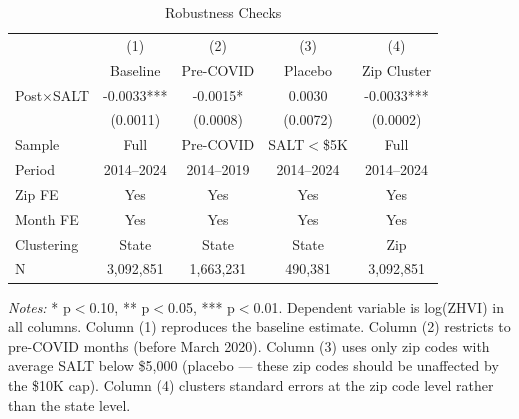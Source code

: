 \begin{table}[H]
\centering
\caption{Robustness Checks}
\begin{threeparttable}
\begin{tabular}{lcccc}
\toprule
 & (1) & (2) & (3) & (4) \\
 & Baseline & Pre-COVID & Placebo & Zip Cluster \\
\midrule
Post$\times$SALT & -0.0033*** & -0.0015* & 0.0030 & -0.0033*** \\
 & (0.0011) & (0.0008) & (0.0072) & (0.0002) \\
\midrule
Sample & Full & Pre-COVID & SALT$<$\$5K & Full \\
Period & 2014--2024 & 2014--2019 & 2014--2024 & 2014--2024 \\
Zip FE & Yes & Yes & Yes & Yes \\
Month FE & Yes & Yes & Yes & Yes \\
Clustering & State & State & State & Zip \\
N & 3,092,851 & 1,663,231 & 490,381 & 3,092,851 \\
\bottomrule
\end{tabular}
\begin{tablenotes}[flushleft]
\small
\item \textit{Notes:} * p$<$0.10, ** p$<$0.05, *** p$<$0.01. Dependent variable is log(ZHVI) in all columns. Column (1) reproduces the baseline estimate. Column (2) restricts to pre-COVID months (before March 2020). Column (3) uses only zip codes with average SALT below \$5,000 (placebo --- these zip codes should be unaffected by the \$10K cap). Column (4) clusters standard errors at the zip code level rather than the state level.
\end{tablenotes}
\end{threeparttable}
\label{tab:robust}
\end{table}

